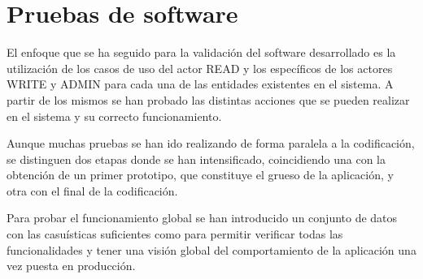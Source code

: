 \chapter{Pruebas de software}
\label{chap:pruebas}

El enfoque que se ha seguido para la validación del software desarrollado es la utilización de los casos de uso del actor READ y los específicos de los actores WRITE y ADMIN para cada una de las entidades existentes en el sistema. A partir de los mismos se han probado las distintas acciones que se
pueden realizar en el sistema y su correcto funcionamiento.

Aunque muchas pruebas se han ido realizando de forma paralela a la
codificación, se distinguen dos etapas donde se han intensificado, coincidiendo una con la obtención de un primer prototipo, que constituye el grueso de la aplicación, y otra con el final de la codificación.

Para probar el funcionamiento global se han introducido un conjunto de datos con las casuísticas suficientes como para permitir verificar todas las funcionalidades y tener una visión global del comportamiento de la aplicación una vez puesta en producción.


